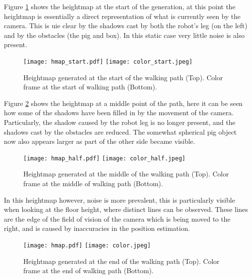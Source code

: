         \newpage
        \noindent
        Figure \ref{fig:hardware_hmap_start} shows the heightmap at the start of the generation, at this point the heightmap is essentially a direct representation of what is
        currently seen by the camera. This is uie clear by the shadows cast by both the robot's leg (on the left) and by the obstacles (the pig and box). In this static case
        very little noise is also present.
        \begin{figure}[h]
            \centering
            \texttt{[image: hmap\_start.pdf]}
            \texttt{[image: color\_start.jpeg]}
            \caption{Heightmap generated at the start of the walking path (Top). Color frame at the start of walking path (Bottom).}
            \label{fig:hardware_hmap_start}
        \end{figure}
        
        \newpage
        \noindent
        Figure \ref{fig:hardware_hmap_mid} shows the heightmap at a middle point of the path, here it can be seen how some of the shadows have been
        filled in by the movement of the camera. Particularly, the shadow caused by the robot leg is no longer present, and the shadows cast by the
        obstacles are reduced. The somewhat spherical pig object now also appears larger as part of the other side became visible.
        \begin{figure}[h]
            \centering
            \texttt{[image: hmap\_half.pdf]}
            \texttt{[image: color\_half.jpeg]}
            \caption{Heightmap generated at the middle of the walking path (Top). Color frame at the middle of walking path (Bottom).}
            \label{fig:hardware_hmap_mid}
        \end{figure}

        \noindent
        In this heightmap however, noise is more prevalent, this is particularly visible when looking at the floor height, where distinct lines can be observed.
        These lines are the edge of the field of vision of the camera which is being moved to the right, and is caused by inaccuracies in the position estimation.

        \begin{figure}[h]
            \centering
            \texttt{[image: hmap.pdf]}
            \texttt{[image: color.jpeg]}
            \caption{Heightmap generated at the end of the walking path (Top). Color frame at the end of walking path (Bottom).}
            \label{fig:hardware_hmap}
        \end{figure}

